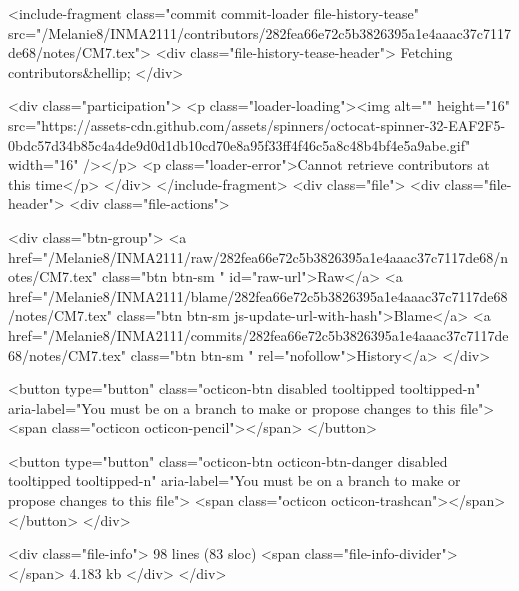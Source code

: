 <include-fragment class="commit commit-loader file-history-tease" src="/Melanie8/INMA2111/contributors/282fea66e72c5b3826395a1e4aaac37c7117de68/notes/CM7.tex">
  <div class="file-history-tease-header">
    Fetching contributors&hellip;
  </div>

  <div class="participation">
    <p class="loader-loading"><img alt="" height="16" src="https://assets-cdn.github.com/assets/spinners/octocat-spinner-32-EAF2F5-0bdc57d34b85c4a4de9d0d1db10cd70e8a95f33ff4f46c5a8c48b4bf4e5a9abe.gif" width="16" /></p>
    <p class="loader-error">Cannot retrieve contributors at this time</p>
  </div>
</include-fragment>
<div class="file">
  <div class="file-header">
    <div class="file-actions">

      <div class="btn-group">
        <a href="/Melanie8/INMA2111/raw/282fea66e72c5b3826395a1e4aaac37c7117de68/notes/CM7.tex" class="btn btn-sm " id="raw-url">Raw</a>
          <a href="/Melanie8/INMA2111/blame/282fea66e72c5b3826395a1e4aaac37c7117de68/notes/CM7.tex" class="btn btn-sm js-update-url-with-hash">Blame</a>
        <a href="/Melanie8/INMA2111/commits/282fea66e72c5b3826395a1e4aaac37c7117de68/notes/CM7.tex" class="btn btn-sm " rel="nofollow">History</a>
      </div>


          <button type="button" class="octicon-btn disabled tooltipped tooltipped-n" aria-label="You must be on a branch to make or propose changes to this file">
            <span class="octicon octicon-pencil"></span>
          </button>

        <button type="button" class="octicon-btn octicon-btn-danger disabled tooltipped tooltipped-n" aria-label="You must be on a branch to make or propose changes to this file">
          <span class="octicon octicon-trashcan"></span>
        </button>
    </div>

    <div class="file-info">
        98 lines (83 sloc)
        <span class="file-info-divider"></span>
      4.183 kb
    </div>
  </div>
  
